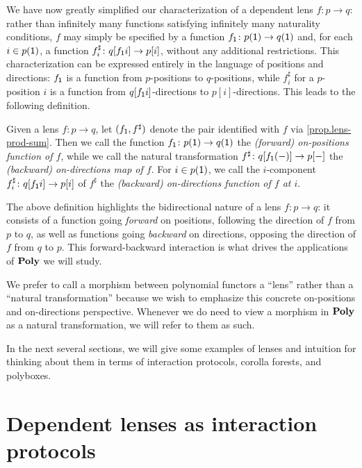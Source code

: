 \documentclass[Book-Poly]{subfiles}
\begin{document}
We have now greatly simplified our characterization of a dependent lens $f\colon p\to q$: rather than infinitely many functions satisfying infinitely many naturality conditions, $f$ may simply be specified by a function $f_{\textsf{1}}\colon p(\textsf{1})\to q(\textsf{1})$ and, for each $i\in p(\textsf{1})$, a function $f^\sharp_i\colon q[f_{\textsf{1}}i]\to p[i]$, without any additional restrictions.
This characterization can be expressed entirely in the language of positions and directions: $f_{\textsf{1}}$ is a function from $p$-positions to $q$-positions, while $f^\sharp_i$ for a $p$-position $i$ is a function from $q[f_{\textsf{1}}i]$-directions to $p[i]$-directions.
This leads to the following definition.

\begin{definition}
  Given a lens $f\colon p\to q$, let $(f_{\textsf{1}}, f^\sharp)$ denote the pair identified with $f$ via \cref{prop.lens-prod-sum}.
  Then we call the function $f_{\textsf{1}}\colon p(\textsf{1})\to q(\textsf{1})$ the \emph{(forward) on-positions function of $f$}, while we call the natural transformation $f^\sharp\colon q[f_{\textsf{1}}(-)]\to p[-]$ the \emph{(backward) on-directions map of $f$}.
  For $i\in p(\textsf{1})$, we call the $i$-component $f^\sharp_i\colon q[f_{\textsf{1}}i]\to p[i]$ of $f^\sharp$ the \emph{(backward) on-directions function of $f$ at $i$}.
\end{definition}

The above definition highlights the bidirectional nature of a lens $f\colon p\to q$: it consists of a function going \textit{forward} on positions, following the direction of $f$ from $p$ to $q$, as well as functions going \textit{backward} on directions, opposing the direction of $f$ from $q$ to $p$.
This forward-backward interaction is what drives the applications of $\mathbf{Poly}$ we will study.

We prefer to call a morphism between polynomial functors a ``lens'' rather than a ``natural transformation'' because we wish to emphasize this concrete on-positions and on-directions perspective.
Whenever we do need to view a morphism in $\mathbf{Poly}$ as a natural transformation, we will refer to them as such.

In the next several sections, we will give some examples of lenses and intuition for thinking about them in terms of interaction protocols, corolla forests, and polyboxes.

\section{Dependent lenses as interaction protocols}
\end{document}
